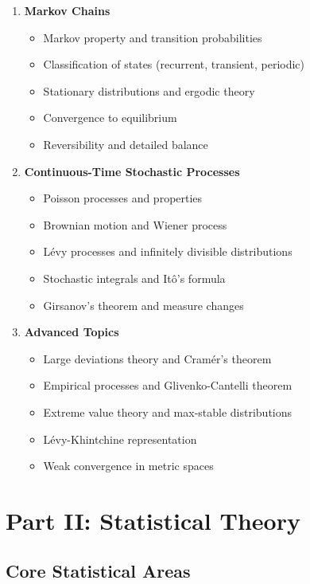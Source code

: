 \documentclass[12pt,a4paper]{article}
\theoremstyle{remark}
\begin{document}
\begin{enumerate}
\item \textbf{Markov Chains}
   \begin{itemize}
   \item Markov property and transition probabilities
   \item Classification of states (recurrent, transient, periodic)
   \item Stationary distributions and ergodic theory
   \item Convergence to equilibrium
   \item Reversibility and detailed balance
   \end{itemize}

\item \textbf{Continuous-Time Stochastic Processes}
   \begin{itemize}
   \item Poisson processes and properties
   \item Brownian motion and Wiener process
   \item Lévy processes and infinitely divisible distributions
   \item Stochastic integrals and Itô's formula
   \item Girsanov's theorem and measure changes
   \end{itemize}

\item \textbf{Advanced Topics}
   \begin{itemize}
   \item Large deviations theory and Cramér's theorem
   \item Empirical processes and Glivenko-Cantelli theorem
   \item Extreme value theory and max-stable distributions
   \item Lévy-Khintchine representation
   \item Weak convergence in metric spaces
   \end{itemize}
\end{enumerate}

\section*{Part II: Statistical Theory}

\subsection*{Core Statistical Areas}
\end{document}
